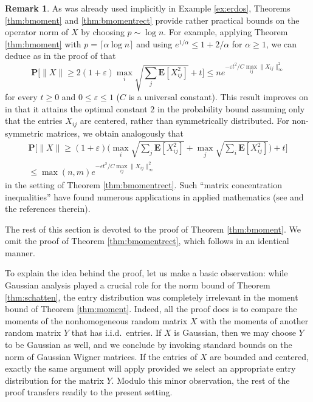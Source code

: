 \documentclass[10pt,reqno]{amsart}
\theoremstyle{definition}
\newtheorem{rem}[thm]{Remark}
\numberwithin{equation}{section}
\numberwithin{figure}{section}
\numberwithin{table}{section}
\begin{document}
\begin{rem}
As was already used implicitly in Example \ref{ex:erdos}, Theorems
\ref{thm:bmoment} and \ref{thm:bmomentrect} provide rather practical 
bounds on the operator norm of $X$ by choosing $p\sim \log n$.
For example, applying Theorem \ref{thm:bmoment} with
$p=\lceil \alpha\log n\rceil$ and using $e^{1/\alpha}\le 1+2/\alpha$
for $\alpha\ge 1$, we can deduce as in the proof of 
\cite[Corollary 3.12]{BvH16} that
$$
	\mathbf{P}\Bigg[\|X\|\ge 2(1+\varepsilon)
	\max_i\sqrt{\sum_j \mathbf{E}[X_{ij}^2]} + t
	\Bigg]
	\le
	n e^{-\varepsilon t^2/C\max_{ij}\|X_{ij}\|_\infty^2}
$$
for every $t\ge 0$ and $0\le \varepsilon\le 1$ ($C$ is a universal 
constant).
This result improves on \cite[Corollary 3.12]{BvH16} in that it 
attains the optimal constant $2$ in the probability bound assuming only
that the entries $X_{ij}$ are centered, rather than symmetrically 
distributed. For non-symmetric matrices, we obtain analogously
that
\begin{multline*}
	\mathbf{P}\Bigg[\|X\|\ge (1+\varepsilon)
	\Bigg(
	\max_i\sqrt{\sum_j \mathbf{E}[X_{ij}^2]} +
	\max_j\sqrt{\sum_i \mathbf{E}[X_{ij}^2]}
	\Bigg)
	 + t
	\Bigg]
	\\ \le
	\max(n,m) e^{-\varepsilon t^2/C\max_{ij}\|X_{ij}\|_\infty^2}
\end{multline*}
in the setting of Theorem \ref{thm:bmomentrect}.
Such ``matrix concentration inequalities'' have found numerous 
applications in applied mathematics (see \cite{Tro15} and the references 
therein).
\end{rem}

The rest of this section is devoted to the proof of Theorem 
\ref{thm:bmoment}. We omit the proof of Theorem \ref{thm:bmomentrect}, 
which follows in an identical manner.

To explain the idea behind the proof, let us make a basic observation: 
while Gaussian analysis played a crucial role for the norm bound of 
Theorem \ref{thm:schatten}, the entry distribution was completely 
irrelevant in the moment bound of Theorem \ref{thm:moment}. Indeed, all 
the proof does is to compare the moments of the nonhomogeneous random 
matrix $X$ with the moments of another random matrix $Y$ that has i.i.d.\ 
entries. If $X$ is Gaussian, then we may choose $Y$ to be Gaussian as 
well, and we conclude by invoking standard bounds on the norm of Gaussian 
Wigner matrices. If the entries of $X$ are bounded and centered, exactly 
the same argument will apply provided we select an appropriate entry 
distribution for the matrix $Y$. Modulo this minor observation, the rest 
of the proof transfers readily to the present setting.
\end{document}
